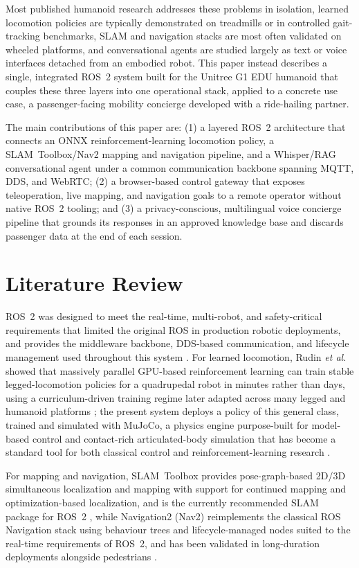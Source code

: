 \documentclass[10pt,twocolumn]{article}
\begin{document}
Most published humanoid research addresses these problems in isolation, learned locomotion policies are typically demonstrated on treadmills or in controlled gait-tracking benchmarks, SLAM and navigation stacks are most often validated on wheeled platforms, and conversational agents are studied largely as text or voice interfaces detached from an embodied robot. This paper instead describes a single, integrated ROS~2 system built for the Unitree G1 EDU humanoid that couples these three layers into one operational stack, applied to a concrete use case, a passenger-facing mobility concierge developed with a ride-hailing partner.

The main contributions of this paper are: (1) a layered ROS~2 architecture that connects an ONNX reinforcement-learning locomotion policy, a SLAM~Toolbox/Nav2 mapping and navigation pipeline, and a Whisper/RAG conversational agent under a common communication backbone spanning MQTT, DDS, and WebRTC; (2) a browser-based control gateway that exposes teleoperation, live mapping, and navigation goals to a remote operator without native ROS~2 tooling; and (3) a privacy-conscious, multilingual voice concierge pipeline that grounds its responses in an approved knowledge base and discards passenger data at the end of each session.

\section{Literature Review}
ROS~2 was designed to meet the real-time, multi-robot, and safety-critical requirements that limited the original ROS in production robotic deployments, and provides the middleware backbone, DDS-based communication, and lifecycle management used throughout this system \cite{macenski2022ros2}. For learned locomotion, Rudin \emph{et al.} showed that massively parallel GPU-based reinforcement learning can train stable legged-locomotion policies for a quadrupedal robot in minutes rather than days, using a curriculum-driven training regime later adapted across many legged and humanoid platforms \cite{rudin2022walk}; the present system deploys a policy of this general class, trained and simulated with MuJoCo, a physics engine purpose-built for model-based control and contact-rich articulated-body simulation that has become a standard tool for both classical control and reinforcement-learning research \cite{todorov2012mujoco}.

For mapping and navigation, SLAM~Toolbox provides pose-graph-based 2D/3D simultaneous localization and mapping with support for continued mapping and optimization-based localization, and is the currently recommended SLAM package for ROS~2 \cite{macenski2021slam}, while Navigation2 (Nav2) reimplements the classical ROS Navigation stack using behaviour trees and lifecycle-managed nodes suited to the real-time requirements of ROS~2, and has been validated in long-duration deployments alongside pedestrians \cite{macenski2020nav2}.
\end{document}
